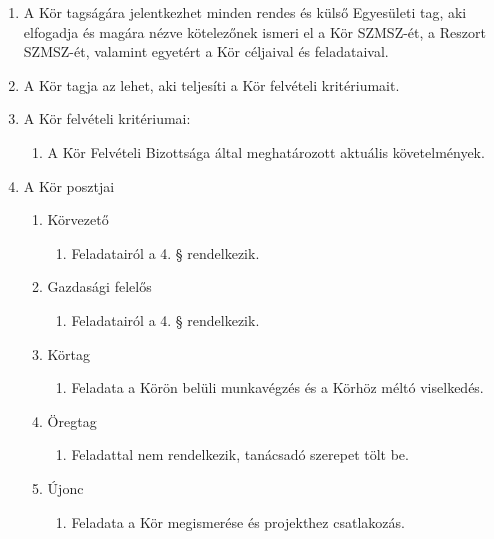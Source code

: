\documentclass[12pt]{article}
\begin{document}
\begin{enumerate}
  \item A Kör tagságára jelentkezhet minden rendes és külső Egyesületi tag, aki elfogadja és magára nézve kötelezőnek ismeri el a Kör SZMSZ-ét, a Reszort SZMSZ-ét, valamint egyetért a Kör céljaival és feladataival.
  
  \item A Kör tagja az lehet, aki teljesíti a Kör felvételi kritériumait.

  \item A Kör felvételi kritériumai:
    \begin{enumerate}
    \item A Kör Felvételi Bizottsága által meghatározott aktuális követelmények.
    \end{enumerate}

  \item A Kör posztjai

\begin{enumerate} %
  \item Körvezető
    \begin{enumerate}
    \item Feladatairól a 4. § rendelkezik.
    \end{enumerate}

  \item Gazdasági felelős
    \begin{enumerate}
        \item Feladatairól a 4. § rendelkezik.
    \end{enumerate}

  \item Körtag
    \begin{enumerate}
        \item Feladata a Körön belüli munkavégzés és a Körhöz méltó viselkedés.
    \end{enumerate}

  \item Öregtag
    \begin{enumerate}
        \item Feladattal nem rendelkezik, tanácsadó szerepet tölt be.
    \end{enumerate}

  \item Újonc
    \begin{enumerate}
        \item Feladata a Kör megismerése és projekthez csatlakozás.
    \end{enumerate}


\end{enumerate}
\end{enumerate}
\end{document}
